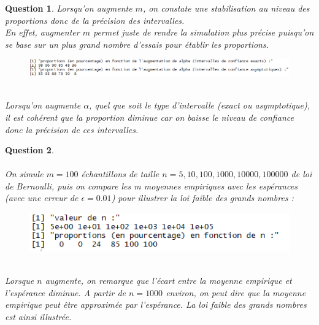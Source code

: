 \documentclass[a4paper,11pt]{article}
\newtheorem{exo4}{Question}
\begin{document}
\begin{exo4}
Lorsqu'on augmente $m$, on constate une stabilisation au niveau des proportions donc de la précision des intervalles. \ \\
En effet, augmenter $m$ permet juste de rendre la simulation plus précise puisqu'on se base sur un plus grand nombre d'essais pour établir les proportions.
\begin{figure}[h]
\includegraphics[scale=0.85]{images/Q4_1_alpha.PNG}
\end{figure} \ \\
Lorsqu'on augmente $\alpha$, quel que soit le type d'intervalle (exact ou asymptotique), il est cohérent que la proportion diminue car on baisse le niveau de confiance donc la précision de ces intervalles. \ \\
\end{exo4}

\begin{exo4} \ \\ \\
On simule $m=100$ échantillons de taille $n=5,10,100,1000,10000,100000$ de loi de Bernoulli, puis on compare les m moyennes empiriques avec les espérances (avec une erreur de $\epsilon=0.01$) pour illustrer la loi faible des grands nombres :
\begin{figure}[h]
\includegraphics[scale=1.2]{images/Q4_2.PNG}
\end{figure} \ \\
Lorsque $n$ augmente, on remarque que l'écart entre la moyenne empirique et l'espérance diminue. A partir de $n=1000$ environ, on peut dire que la moyenne empirique peut être approximée par l'espérance. La loi faible des grands nombres est ainsi illustrée.
\end{exo4}
\end{document}
